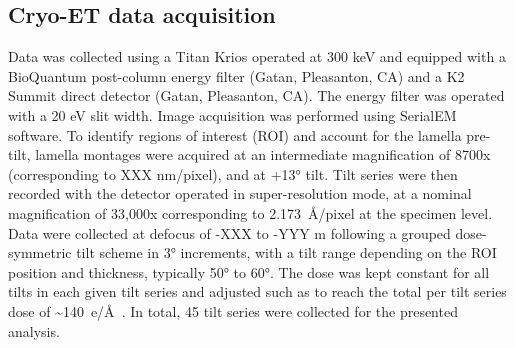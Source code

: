 \subsection{Cryo-ET data acquisition}
Data was collected using a Titan Krios operated at 300 keV and equipped with a BioQuantum post-column energy filter (Gatan, Pleasanton, CA) and a K2 Summit direct detector (Gatan, Pleasanton, CA).
The energy filter was operated with a 20 eV slit width.
Image acquisition was performed using SerialEM software.
To identify regions of interest (ROI) and account for the lamella pre-tilt, lamella montages were acquired at an intermediate magnification of 8700x (corresponding to XXX nm/pixel), and at +\ang{13} tilt.
Tilt series were then recorded with the detector operated in super-resolution mode, at a nominal magnification of 33,000x corresponding to \qty{2.173}{\angstrom/pixel} at the specimen level.
Data were collected at defocus of -XXX to -YYY \mu{}m following a grouped dose-symmetric tilt scheme in 3° increments, with a tilt range depending on the ROI position and thickness, typically \pm\ang{50} to \pm\ang{60}.
The dose was kept constant for all tilts in each given tilt series and adjusted such as to reach the total per tilt series dose of \sim\qty{140}{e/\angstrom}~\cite{ericksonHowBacterialCell2017}.
In total, 45 tilt series were collected for the presented analysis.

